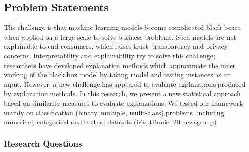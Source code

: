 \documentclass[english]{tktltiki2}
\theoremstyle{definition}
\theoremstyle{remark}
\begin{document}
\subsection{Problem Statements} %
The challenge is that machine learning models become complicated black boxes when applied on a large scale to solve business problems. Such models are not explainable to end consumers, which raises trust, transparency and privacy concerns. Interpretability and explainability try to solve this challenge; researchers have developed explanation methods which approximate the inner working of the black box model by taking model and testing instances as an input. However, a new challenge has appeared to evaluate explanations produced by explanation methods. In this research, we present a new statistical approach based on similarity measures to evaluate explanations. We tested our framework mainly on classification (binary, multiple, multi-class) problems, including numerical, categorical and textual datasets (iris, titanic, 20-newsgroup).

\subsubsection{Research Questions} %
\end{document}

